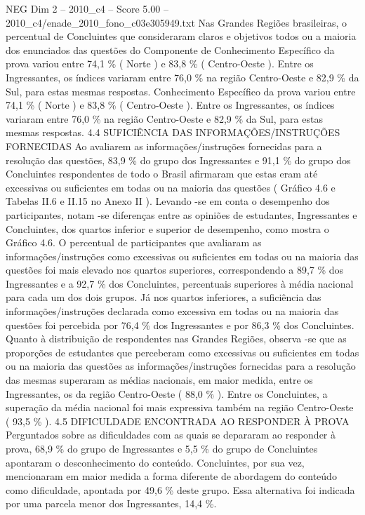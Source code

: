 \begin{textsample}{NEG Dim 2 – 2010\_c4 – Score 5.00 – 2010\_c4/enade\_2010\_fono\_c03e305949.txt}
Nas Grandes Regiões brasileiras, o percentual de Concluintes que consideraram claros e objetivos todos ou a maioria dos enunciados das questões do Componente de Conhecimento Específico da prova variou entre 74,1 \% ( Norte ) e 83,8 \% ( Centro-Oeste ).
Entre os Ingressantes, os índices variaram entre 76,0 \% na região Centro-Oeste e 82,9 \% da Sul, para estas mesmas respostas.
Conhecimento Específico da prova variou entre 74,1 \% ( Norte ) e 83,8 \% ( Centro-Oeste ).
Entre os Ingressantes, os índices variaram entre 76,0 \% na região Centro-Oeste e 82,9 \% da Sul, para estas mesmas respostas. 4.4 SUFICIÊNCIA DAS INFORMAÇÕES/INSTRUÇÕES FORNECIDAS Ao avaliarem as informações/instruções fornecidas para a resolução das questões, 83,9 \% do grupo dos Ingressantes e 91,1 \% do grupo dos Concluintes respondentes de todo o Brasil afirmaram que estas eram até excessivas ou suficientes em todas ou na maioria das questões ( Gráfico 4.6 e Tabelas II.6 e II.15 no Anexo II ).
Levando -se em conta o desempenho dos participantes, notam -se diferenças entre as opiniões de estudantes, Ingressantes e Concluintes, dos quartos inferior e superior de desempenho, como mostra o Gráfico 4.6.
O percentual de participantes que avaliaram as informações/instruções como excessivas ou suficientes em todas ou na maioria das questões foi mais elevado nos quartos superiores, correspondendo a 89,7 \% dos Ingressantes e a 92,7 \% dos Concluintes, percentuais superiores à média nacional para cada um dos dois grupos.
Já nos quartos inferiores, a suficiência das informações/instruções declarada como excessiva em todas ou na maioria das questões foi percebida por 76,4 \% dos Ingressantes e por 86,3 \% dos Concluintes.
Quanto à distribuição de respondentes nas Grandes Regiões, observa -se que as proporções de estudantes que perceberam como excessivas ou suficientes em todas ou na maioria das questões as informações/instruções fornecidas para a resolução das mesmas superaram as médias nacionais, em maior medida, entre os Ingressantes, os da região Centro-Oeste ( 88,0 \% ).
Entre os Concluintes, a superação da média nacional foi mais expressiva também na região Centro-Oeste ( 93,5 \% ). 4.5 DIFICULDADE ENCONTRADA AO RESPONDER À PROVA Perguntados sobre as dificuldades com as quais se depararam ao responder à prova, 68,9 \% do grupo de Ingressantes e 5,5 \% do grupo de Concluintes apontaram o desconhecimento do conteúdo.
Concluintes, por sua vez, mencionaram em maior medida a forma diferente de abordagem do conteúdo como dificuldade, apontada por 49,6 \% deste grupo.
Essa alternativa foi indicada por uma parcela menor dos Ingressantes, 14,4 \%.

\end{textsample}
